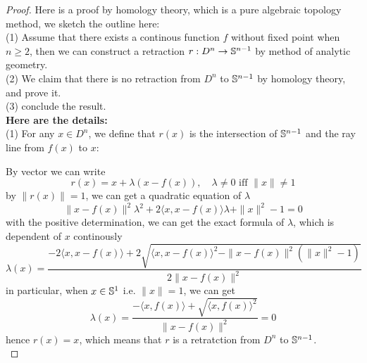 \documentclass[12pt,a4paper]{article}
\begin{document}
\begin{proof}
    Here is a proof by homology theory, which is a pure algebraic topology method, we sketch the outline here:\\
    (1) Assume that there exists a continous function \(f\) without fixed point when \(n\geq 2\), then we can construct a retraction \(r:D^n \to \mathbb{S}^{n-1}\) by method of analytic geometry.\\
    (2) We claim that there is no retraction from \(D^n\) to \(\mathbb{S}^{n-1}\) by homology theory, and prove it.\\
    (3) conclude the result.\\

    \textbf{Here are the details:}\\
    (1) For any \(x \in D^n\), we define that \(r(x)\) is the intersection of \(\mathbb{S}^{n-1}\) and the ray line from \(f(x)\) to \(x\):
      \begin{center}
    \end{center}
    By vector we can write
    \[r(x) = x + \lambda(x-f(x)), \quad \lambda \neq 0 \text{ iff } \|x\|\neq 1\]
    by \(\|r(x)\|=1\), we can get a quadratic equation of \(\lambda\)
    \[\|x-f(x)\|^2 \lambda^2 + 2\langle x, x-f(x) \rangle \lambda + \|x\|^2 - 1 = 0\]
    with the positive determination, we can get the exact formula of \(\lambda\), which is dependent of \(x\) continously
    \[\lambda(x) = \frac{-2\langle x, x-f(x)\rangle+2 \sqrt{\langle x, x-f(x) \rangle^2-\|x-f(x)\|^2(\|x\|^2-1)}}{2\|x-f(x)\|^2}\]
    in particular, when \(x \in \mathbb{S}^1\) i.e. \(\|x\|=1\), we can get
    \[\lambda(x) = \frac{-\langle x,f(x) \rangle +  \sqrt{\langle x,f(x) \rangle^2}}{\|x-f(x)\|^2} = 0\]
    hence \(r(x) = x\), which means that \(r\) is a retratction from \(D^n\) to \(\mathbb{S}^{n-1}\).\\


\end{proof}
\end{document}
